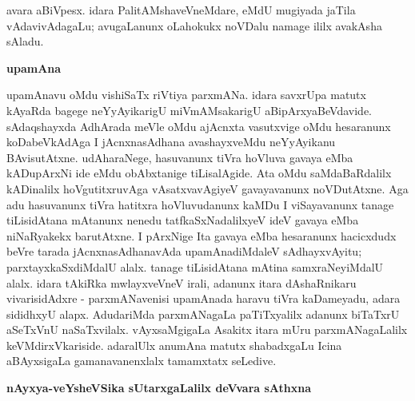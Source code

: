 avara aBiVpesx. idara PalitAMshaveVneMdare, eMdU mugiyada jaTila vAdavivAdagaLu; avugaLanunx oLa\-hokukx noVDalu namage ililx avakAsha sAladu.

\smallskip
\begin{center}
{\Large\bf upamAna}
\end{center}

upamAnavu oMdu vishiSaTx riVtiya parxmANa. idara savxrUpa matutx kAyaRda bagege neYyAyikarigU miVmAMsakarigU aBipArxyaBeVdavide. sAdaqshayxda AdhArada meVle oMdu ajAcnxta vasutxvige oMdu hesaranunx koDabeVkAdAga I jAcnxnasAdhana avashayxveMdu neYyAyikanu BAvisutAtxne. udAharaNege, hasuvanunx tiVra hoVluva gavaya eMba kADupArxNi ide eMdu obAbxtanige tiLisalAgide. Ata oMdu saMdaBaRdalilx kADinalilx hoVgutitxruvAga vAsatxvavAgiyeV gavayavanunx noVDutAtxne. Aga adu hasuvanunx tiVra hatitxra hoVluvudanunx kaMDu I viSayavanunx tanage tiLisidAtana mAtanunx nenedu tatfkaSxNadalilxyeV ideV gavaya eMba niNaRyakekx barutAtxne. I pArxNige Ita gavaya eMba hesaranunx hacicxdudx beVre tarada jAcnxnasAdhanavAda upamAnadiMdaleV sAdhayxvAyitu; parxtayxkaSxdiMdalU alalx. tanage tiLisidAtana mAtina samxraNeyiMdalU alalx. idara tAkiRka mwlayxveVneV irali, adanunx itara dAshaRnikaru vivarisidAdxre - parxmANavenisi upamAnada haravu tiVra kaDameyadu, adara sididhxyU alapx. AdudariMda parxmANagaLa paTiTxyalilx adanunx biTaTxrU aSeTxVnU naSaTxvilalx. vAyxsaMgigaLa Asakitx itara mUru parxmANagaLalilx keVMdirxVkariside. adaralUlx anumAna matutx shabadxgaLu Icina aBAyxsigaLa gamanavanenxlalx tamamxtatx seLedive.

\smallskip
\begin{center}
{\Large\bf nAyxya-veYsheVSika sUtarxgaLalilx deVvara sAthxna}
\end{center}

